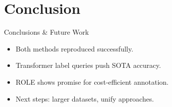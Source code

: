 \section{Conclusion}

\begin{frame}{Conclusions \& Future Work}
  \begin{itemize}
    \item Both methods reproduced successfully.
    \item Transformer label queries push SOTA accuracy.
    \item ROLE shows promise for cost‑efficient annotation.
    \item Next steps: larger datasets, unify approaches.
  \end{itemize}
\end{frame}
